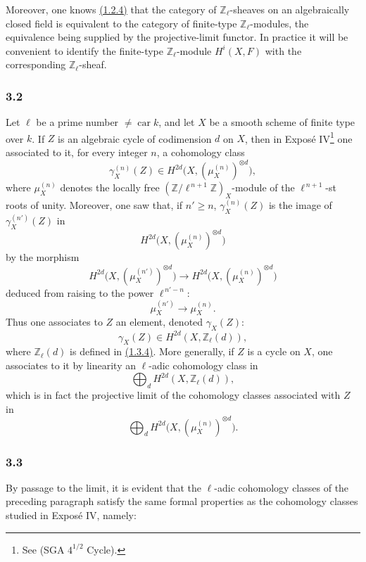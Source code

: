 \documentclass[11pt]{article}
\providecommand{\car}{\operatorname{car}}
\providecommand{\car}{\operatorname{car}}
\providecommand{\car}{\operatorname{car}}
\begin{document}
Moreover, one knows \hyperref[sga5:VI:subsubsection:1.2.4]{(1.2.4)} that the category of \(\mathbb Z_\ell\)-sheaves on an algebraically closed field is equivalent to the category of finite-type \(\mathbb Z_\ell\)-modules, the equivalence being supplied by the projective-limit functor. In practice it will be convenient to identify the finite-type \(\mathbb Z_\ell\)-module \(H^i(X,F)\) with the corresponding \(\mathbb Z_\ell\)-sheaf.

\subsubsection*{3.2}\label{sga5:VI:subsubsection:3.2}
Let \(\ell\) be a prime number \(\ne\car k\), and let \(X\) be a smooth scheme of finite type over \(k\). If \(Z\) is an algebraic cycle of codimension \(d\) on \(X\), then in Exposé IV\footnote{See (SGA \(4^{1/2}\) Cycle).} one associated to it, for every integer \(n\), a cohomology class
\[
\gamma_X^{(n)}(Z)\in H^{2d}\bigl(X,(\mu_X^{(n)})^{\otimes d}\bigr),
\]
where \(\mu_X^{(n)}\) denotes the locally free \((\mathbb Z/\ell^{\,n+1}\mathbb Z)_X\)-module of the \(\ell^{\,n+1}\)-st roots of unity. Moreover, one saw that, if \(n'\ge n\), \(\gamma_X^{(n)}(Z)\) is the image of \(\gamma_X^{(n')}(Z)\) in
\[
H^{2d}\bigl(X,(\mu_X^{(n)})^{\otimes d}\bigr)
\]
by the morphism
\[
H^{2d}\bigl(X,(\mu_X^{(n')})^{\otimes d}\bigr)
\longrightarrow
H^{2d}\bigl(X,(\mu_X^{(n)})^{\otimes d}\bigr)
\]
deduced from raising to the power \(\ell^{\,n'-n}\):
\[
\mu_X^{(n')}\longrightarrow \mu_X^{(n)}.
\]
Thus one associates to \(Z\) an element, denoted \(\gamma_X(Z)\):
\[
\gamma_X(Z)\in H^{2d}(X,\mathbb Z_\ell(d)),
\]
where \(\mathbb Z_\ell(d)\) is defined in \hyperref[sga5:VI:subsubsection:1.3.4]{(1.3.4)}. More generally, if \(Z\) is a cycle on \(X\), one associates to it by linearity an \(\ell\)-adic cohomology class in
\[
\bigoplus_d H^{2d}(X,\mathbb Z_\ell(d)),
\]
which is in fact the projective limit of the cohomology classes associated with \(Z\) in
\[
\bigoplus_d H^{2d}\bigl(X,(\mu_X^{(n)})^{\otimes d}\bigr).
\]

\subsubsection*{3.3}\label{sga5:VI:subsubsection:3.3}
By passage to the limit, it is evident that the \(\ell\)-adic cohomology classes of the preceding paragraph satisfy the same formal properties as the cohomology classes studied in Exposé IV, namely:
\end{document}
